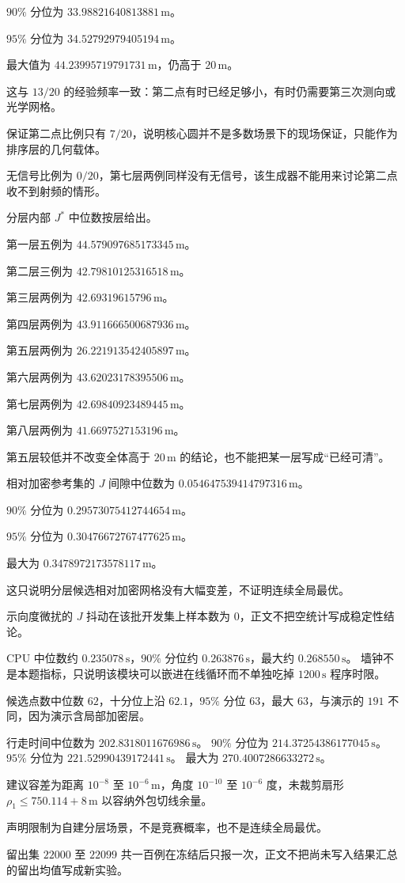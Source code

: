 $90\%$ 分位为 $33.98821640813881\,\mathrm{m}$。

$95\%$ 分位为 $34.52792979405194\,\mathrm{m}$。

最大值为 $44.23995719791731\,\mathrm{m}$，仍高于 $20\,\mathrm{m}$。

这与 $13/20$ 的经验频率一致：第二点有时已经足够小，有时仍需要第三次测向或光学网格。

保证第二点比例只有 $7/20$，说明核心圆并不是多数场景下的现场保证，只能作为排序层的几何载体。

无信号比例为 $0/20$，第七层两例同样没有无信号，该生成器不能用来讨论第二点收不到射频的情形。

分层内部 $J^\ast$ 中位数按层给出。

第一层五例为 $44.579097685173345\,\mathrm{m}$。

第二层三例为 $42.79810125316518\,\mathrm{m}$。

第三层两例为 $42.69319615796\,\mathrm{m}$。

第四层两例为 $43.911666500687936\,\mathrm{m}$。

第五层两例为 $26.221913542405897\,\mathrm{m}$。

第六层两例为 $43.62023178395506\,\mathrm{m}$。

第七层两例为 $42.69840923489445\,\mathrm{m}$。

第八层两例为 $41.6697527153196\,\mathrm{m}$。

第五层较低并不改变全体高于 $20\,\mathrm{m}$ 的结论，也不能把某一层写成“已经可清”。

相对加密参考集的 $J$ 间隙中位数为 $0.054647539414797316\,\mathrm{m}$。

$90\%$ 分位为 $0.29573075412744654\,\mathrm{m}$。

$95\%$ 分位为 $0.30476672767477625\,\mathrm{m}$。

最大为 $0.3478972173578117\,\mathrm{m}$。

这只说明分层候选相对加密网格没有大幅变差，不证明连续全局最优。

示向度微扰的 $J$ 抖动在该批开发集上样本数为 $0$，正文不把空统计写成稳定性结论。

CPU 中位数约 $0.235078\,\mathrm{s}$，$90\%$ 分位约 $0.263876\,\mathrm{s}$，最大约 $0.268550\,\mathrm{s}$。
墙钟不是本题指标，只说明该模块可以嵌进在线循环而不单独吃掉 $1200\,\mathrm{s}$ 程序时限。

候选点数中位数 $62$，十分位上沿 $62.1$，$95\%$ 分位 $63$，最大 $63$，与演示的 $191$ 不同，因为演示含局部加密层。

行走时间中位数为 $202.8318011676986\,\mathrm{s}$。
$90\%$ 分位为 $214.37254386177045\,\mathrm{s}$。
$95\%$ 分位为 $221.52990439172441\,\mathrm{s}$。
最大为 $270.4007286633272\,\mathrm{s}$。

建议容差为距离 $10^{-8}$ 至 $10^{-6}\,\mathrm{m}$，角度 $10^{-10}$ 至 $10^{-6}$ 度，未裁剪扇形 $\rho_1\le 750.114+8\,\mathrm{m}$ 以容纳外包切线余量。

声明限制为自建分层场景，不是竞赛概率，也不是连续全局最优。

留出集 $22000$ 至 $22099$ 共一百例在冻结后只报一次，正文不把尚未写入结果汇总的留出均值写成新实验。
